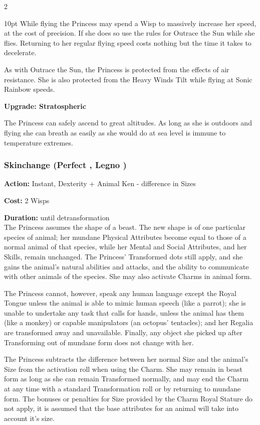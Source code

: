 \begin{multicols}{2}
\begin{myindentpar}{10pt}
While flying the Princess may spend a Wisp to massively increase her speed, at the cost of precision. If she does so use the rules for Outrace the Sun while she flies. Returning to her regular flying speed costs nothing but the time it takes to decelerate.

As with Outrace the Sun, the Princess is protected from the effects of air resistance. She is also protected from the Heavy Winds Tilt while flying at Sonic Rainbow speeds. 

\textbf{Upgrade: Stratospheric}

The Princess can safely ascend to great altitudes. As long as she is outdoors and flying she can breath as easily as she would do at sea level is immune to temperature extremes. 

\end{myindentpar}

\subsubsection*{Skinchange (Perfect \textbullet\textbullet\textbullet\textbullet, Legno  \textbullet\textbullet\textbullet)}

\noindent \textbf{Action:} Instant, Dexterity + Animal Ken - difference in Sizes

\noindent \textbf{Cost:} 2 Wisps

\noindent \textbf{Duration:} until detransformation \\

\noindent The Princess assumes the shape of a beast. The new shape is of one particular species of animal; her mundane Physical Attributes become equal to those of a normal animal of that species, while her Mental and Social Attributes, and her Skills, remain unchanged. The Princess' Transformed dots still apply, and she gains the animal's natural abilities and attacks, and the ability to communicate with other animals of the species. She may also activate Charms in animal form.

The Princess cannot, however, speak any human language except the Royal Tongue unless the animal is able to mimic human speech (like a parrot); she is unable to undertake any task that calls for hands, unless the animal has them (like a monkey) or capable manipulators (an octopus' tentacles); and her Regalia are transformed away and unavailable. Finally, any object she picked up after Transforming out of mundane form does not change with her.

The Princess subtracts the difference between her normal Size and the animal's Size from the activation roll when using the Charm. She may remain in beast form as long as she can remain Transformed normally, and may end the Charm at any time with a standard Transformation roll or by returning to mundane form. The bonuses or penalties for Size provided by the Charm Royal Stature do not apply, it is assumed that the base attributes for an animal will take into account it's size. 


\end{multicols}
